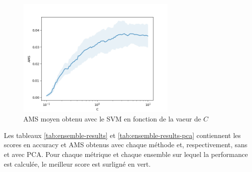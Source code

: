 \documentclass[12pt]{article}
\begin{document}
\begin{figure}[H]
    \center
    \includegraphics[width=0.7\textwidth]{images/ams.png}
    \caption{AMS moyen obtenu avec le SVM en fonction de la vaeur de $C$}
    \label{img:ams-C}
\end{figure}

\begin{mdframed}[hidealllines=true,backgroundcolor=blue!20]
Les tableaux \ref{tab:ensemble-results} et \ref{tab:ensemble-results-pca}
contiennent les scores en accuracy et AMS obtenus avec chaque méthode et,
respectivement, sans et avec PCA. Pour chaque métrique et chaque ensemble sur
lequel la performance est calculée, le meilleur score est surligné en vert.
\end{mdframed}

\begin{table}[H]
    \caption{Performances obtenues avec chaque méthode (sans PCA)}
    \label{tab:ensemble-results}
\end{table}
\end{document}
